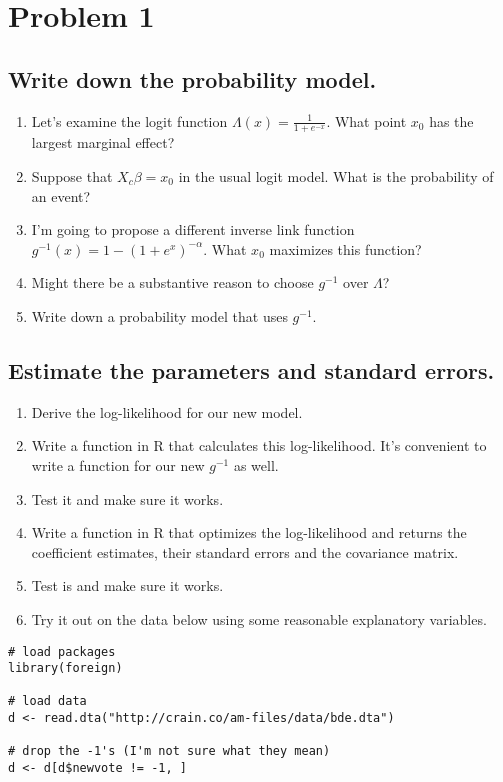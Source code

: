 \documentclass[12pt]{article}
\begin{document}
\section*{Problem 1}

\subsection*{Write down the probability model.}

\begin{enumerate}
\item Let's examine the logit function $\Lambda(x) = \frac{1}{1 + e^{-x}}$. What point $x_0$ has the largest marginal effect? 
\item Suppose that $X_c\beta = x_0$ in the usual logit model. What is the probability of an event?
\item I'm going to propose a different inverse link function $g^{-1}(x) = 1 - (1 + e^x)^{-\alpha}$. What $x_0$ maximizes this function?
\item Might there be a substantive reason to choose $g^{-1}$ over $\Lambda$?
\item Write down a probability model that uses $g^{-1}$.
\end{enumerate}

\subsection*{Estimate the parameters and standard errors.}

\begin{enumerate}
\item Derive the log-likelihood for our new model.
\item Write a function in R that calculates this log-likelihood. It's convenient to write a function for our new $g^{-1}$ as well.
\item Test it and make sure it works.
\item Write a function in R that optimizes the log-likelihood and returns the coefficient estimates, their standard errors and the covariance matrix.
\item Test is and make sure it works.
\item Try it out on the data below using some reasonable explanatory variables.
\end{enumerate}

\begin{verbatim}
# load packages
library(foreign)

# load data
d <- read.dta("http://crain.co/am-files/data/bde.dta")

# drop the -1's (I'm not sure what they mean)
d <- d[d$newvote != -1, ]
\end{verbatim}
\end{document}
